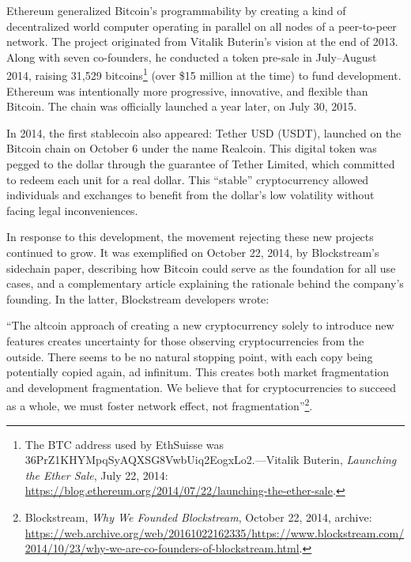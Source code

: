 \documentclass[
  a5paper,
  smalldemyvopaper,10pt,twoside,onecolumn,openright,extrafontsizes,hidelinks]{memoir}
\begin{document}
Ethereum generalized Bitcoin's programmability by creating a kind of
decentralized world computer operating in parallel on all nodes of a
peer-to-peer network. The project originated from Vitalik Buterin's
vision at the end of 2013. Along with seven co-founders, he conducted a
token pre-sale in July--August 2014, raising 31,529 bitcoins\footnote{The
  BTC address used by EthSuisse was
  36PrZ1KHYMpqSyAQXSG8VwbUiq2EogxLo2.---Vitalik Buterin, \emph{Launching
  the Ether Sale}, July 22, 2014:
  \url{https://blog.ethereum.org/2014/07/22/launching-the-ether-sale}.}
(over \$15 million at the time) to fund development. Ethereum was
intentionally more progressive, innovative, and flexible than Bitcoin.
The chain was officially launched a year later, on July 30, 2015.

In 2014, the first stablecoin also appeared: Tether USD (USDT), launched
on the Bitcoin chain on October 6 under the name Realcoin. This digital
token was pegged to the dollar through the guarantee of Tether Limited,
which committed to redeem each unit for a real dollar. This ``stable''
cryptocurrency allowed individuals and exchanges to benefit from the
dollar's low volatility without facing legal inconveniences.

In response to this development, the movement rejecting these new
projects continued to grow. It was exemplified on October 22, 2014, by
Blockstream's sidechain paper, describing how Bitcoin could serve as the
foundation for all use cases, and a complementary article explaining the
rationale behind the company's founding. In the latter, Blockstream
developers wrote:

``The altcoin approach of creating a new cryptocurrency solely to
introduce new features creates uncertainty for those observing
cryptocurrencies from the outside. There seems to be no natural stopping
point, with each copy being potentially copied again, ad infinitum. This
creates both market fragmentation and development fragmentation. We
believe that for cryptocurrencies to succeed as a whole, we must foster
network effect, not fragmentation''\footnote{Blockstream, \emph{Why We
  Founded Blockstream}, October 22, 2014, archive:
  \url{https://web.archive.org/web/20161022162335/https://www.blockstream.com/2014/10/23/why-we-are-co-founders-of-blockstream.html}.}.
\end{document}
